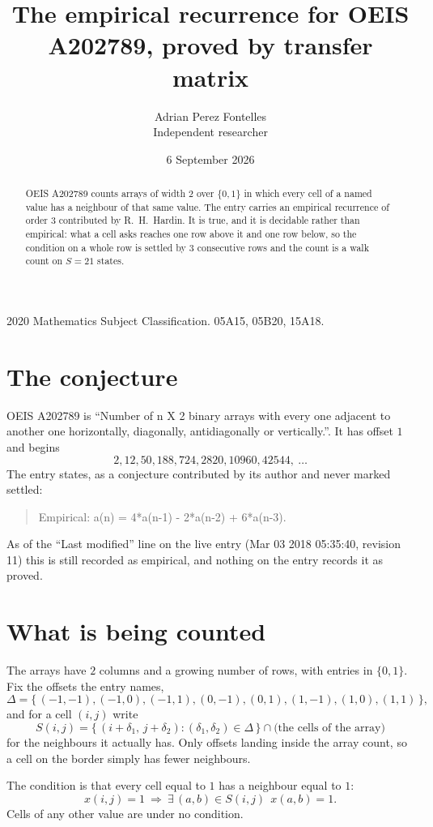 \documentclass[11pt,a4paper]{article}
\title{The empirical recurrence for OEIS A202789, proved by transfer matrix}
\author{Adrian Perez Fontelles\\ \small Independent researcher}
\date{6 September 2026}
\theoremstyle{plain}
\theoremstyle{definition}
\begin{document}
\maketitle

\begin{abstract}
OEIS A202789 counts arrays of width $2$ over $\{0,1\}$ in which every cell of a named value has a neighbour of that same value. The entry carries an
empirical recurrence of order $3$ contributed by R.~H.~Hardin. It is true, and it is
decidable rather than empirical: what a cell asks reaches one row above it and one row below, so the
condition on a whole row is settled by $3$ consecutive rows and the count is a walk
count on $S=21$ states.
\end{abstract}

\noindent\small 2020 Mathematics Subject Classification. 05A15, 05B20, 15A18.\normalsize

\section{The conjecture}

OEIS A202789 is ``Number of n X 2 binary arrays with every one adjacent to another one horizontally, diagonally, antidiagonally or vertically.''. It has offset $1$ and begins
\[
2, 12, 50, 188, 724, 2820, 10960, 42544,\ \dots
\]
The entry states, as a conjecture contributed by its author and never marked settled:
\begin{quote}
Empirical: a(n) = 4*a(n-1) - 2*a(n-2) + 6*a(n-3).
\end{quote}
As of the ``Last modified'' line on the live entry (Mar 03 2018 05:35:40, revision 11) this is still
recorded as empirical, and nothing on the entry records it as proved.

\section{What is being counted}

The arrays have $2$ columns and a growing number of rows, with entries in $\{0,1\}$. Fix the
offsets the entry names,
\[
\Delta=\{\,(-1,-1), (-1,0), (-1,1), (0,-1), (0,1), (1,-1), (1,0), (1,1)\,\},
\]
and for a cell $(i,j)$ write
\[
S(i,j)=\{\,(i+\delta_1,\,j+\delta_2) : (\delta_1,\delta_2)\in\Delta\,\}\cap
\text{(the cells of the array)}
\]
for the neighbours it actually has. Only offsets landing inside the array count, so a cell on
the border simply has fewer neighbours.

The condition is that every cell equal to $1$ has a neighbour equal to $1$:
\[
x(i,j)=1\ \Longrightarrow\ \exists\,(a,b)\in S(i,j)\ \ x(a,b)=1 .
\]
Cells of any other value are under no condition.
\end{document}
